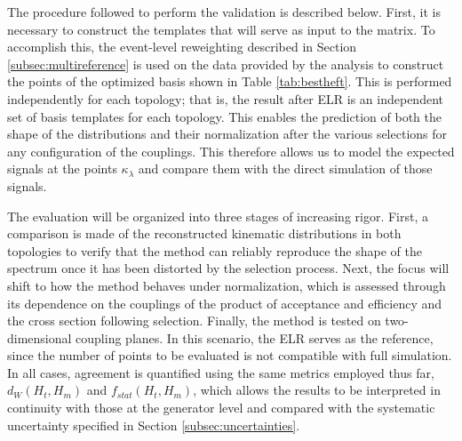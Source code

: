 
The procedure followed to perform the validation is described below. First, it is necessary to construct the templates that will serve as input to the matrix. To accomplish this, the event-level reweighting described in Section \ref{subsec:multireference} is used on the data provided by the analysis to construct the points of the optimized basis shown in Table \ref{tab:bestheft}. This is performed independently for each topology; that is, the result after ELR is an independent set of basis templates for each topology. This enables the prediction of both the shape of the distributions and their normalization after the various selections for any configuration of the couplings. This therefore allows us to model the expected signals at the points $\kappa_\lambda$ and compare them with the direct simulation of those signals.

The evaluation will be organized into three stages of increasing rigor. First, a comparison is made of the reconstructed kinematic distributions in both topologies to verify that the method can reliably reproduce the shape of the spectrum once it has been distorted by the selection process. Next, the focus will shift to how the method behaves under normalization, which is assessed through its dependence on the couplings of the product of acceptance and efficiency and the cross section following selection. Finally, the method is tested on two-dimensional coupling planes. In this scenario, the ELR serves as the reference, since the number of points to be evaluated is not compatible with full simulation. In all cases, agreement is quantified using the same metrics employed thus far, $d_W(H_{t},H_{m})$ and $f_{stat}(H_{t},H_{m})$, which allows the results to be interpreted in continuity with those at the generator level and compared with the systematic uncertainty specified in Section \ref {subsec:uncertainties}.\medskip

